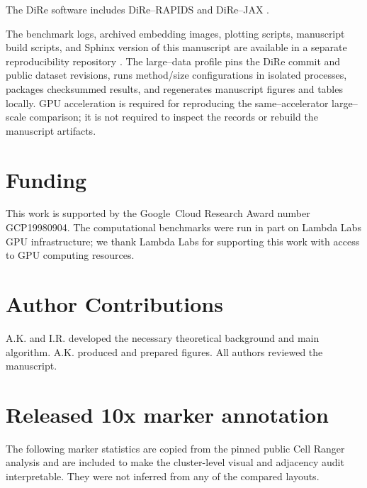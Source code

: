 \documentclass[11pt]{article}
\begin{document}
The DiRe software includes DiRe--RAPIDS \cite{dire-rapids} and DiRe--JAX \cite{dire-github,dire-joss}.

The benchmark logs, archived embedding images, plotting scripts, manuscript
build scripts, and Sphinx version of this manuscript are available in a
separate reproducibility repository \cite{homological-stability-repro}. The
large--data profile pins the DiRe commit and public dataset revisions, runs
method/size configurations in isolated processes, packages checksummed results,
and regenerates manuscript figures and tables locally. GPU acceleration is
required for reproducing the same--accelerator large--scale comparison; it is
not required to inspect the records or rebuild the manuscript artifacts.

\section{Funding} This work is supported by the Google~Cloud Research Award number GCP19980904. The computational benchmarks were run in part on Lambda Labs GPU infrastructure; we thank Lambda Labs for supporting this work with access to GPU computing resources.

\section{Author Contributions} A.K. and I.R. developed the necessary theoretical background and main algorithm. A.K. produced and prepared figures. All authors reviewed the manuscript.

\newpage

\begingroup
\sloppy
\printbibliography
\endgroup

\newpage

\appendix
\section{Released 10x marker annotation}

The following marker statistics are copied from the pinned public Cell Ranger
analysis and are included to make the cluster-level visual and adjacency audit
interpretable. They were not inferred from any of the compared layouts.



\newpage
\end{document}
